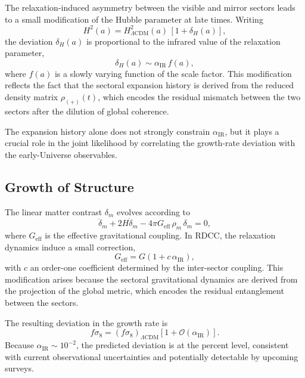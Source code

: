 \documentclass[11pt,a4paper]{article}
\begin{document}
The relaxation-induced asymmetry between the visible and mirror sectors leads to a small
modification of the Hubble parameter at late times. Writing
\begin{equation}
    H^2(a) = H^2_{\Lambda\mathrm{CDM}}(a)\,\left[1 + \delta_H(a)\right],
\end{equation}
the deviation $\delta_H(a)$ is proportional to the infrared value of the relaxation parameter,
\begin{equation}
    \delta_H(a) \sim \alpha_{\mathrm{IR}}\,f(a),
\end{equation}
where $f(a)$ is a slowly varying function of the scale factor. This modification reflects the fact
that the sectoral expansion history is derived from the reduced density matrix
$\rho_{(+)}(t)$, which encodes the residual mismatch between the two sectors after the dilution
of global coherence.

The expansion history alone does not strongly constrain $\alpha_{\mathrm{IR}}$, but it plays a crucial
role in the joint likelihood by correlating the growth-rate deviation with the early-Universe
observables.

\subsection{Growth of Structure}

The linear matter contrast $\delta_m$ evolves according to
\begin{equation}
    \ddot{\delta}_m + 2H\dot{\delta}_m - 4\pi G_{\mathrm{eff}}\,\rho_m\,\delta_m = 0,
\end{equation}
where $G_{\mathrm{eff}}$ is the effective gravitational coupling. In RDCC, the relaxation dynamics
induce a small correction,
\begin{equation}
    G_{\mathrm{eff}} = G\left(1 + c\,\alpha_{\mathrm{IR}}\right),
\end{equation}
with $c$ an order-one coefficient determined by the inter-sector coupling. This modification
arises because the sectoral gravitational dynamics are derived from the projection of the global
metric, which encodes the residual entanglement between the sectors.

The resulting deviation in the growth rate is
\begin{equation}
    f\sigma_8 = (f\sigma_8)_{\Lambda\mathrm{CDM}}
    \left[1 + \mathcal{O}(\alpha_{\mathrm{IR}})\right].
\end{equation}
Because $\alpha_{\mathrm{IR}} \sim 10^{-2}$, the predicted deviation is at the percent level, consistent
with current observational uncertainties and potentially detectable by upcoming surveys.
\end{document}
